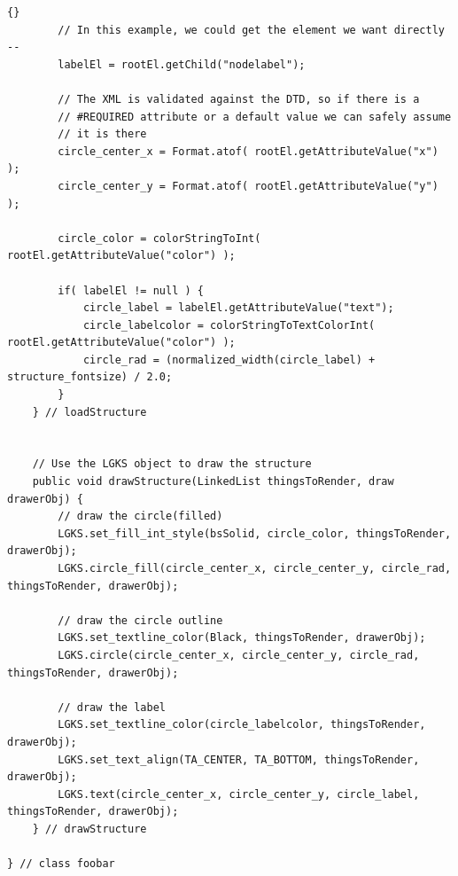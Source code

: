 \documentclass[12pt]{article}
\begin{document}
\begin{lstlisting}{}
        // In this example, we could get the element we want directly --
        labelEl = rootEl.getChild("nodelabel");
        
        // The XML is validated against the DTD, so if there is a
        // #REQUIRED attribute or a default value we can safely assume
        // it is there
        circle_center_x = Format.atof( rootEl.getAttributeValue("x") );
        circle_center_y = Format.atof( rootEl.getAttributeValue("y") );

        circle_color = colorStringToInt( rootEl.getAttributeValue("color") );

        if( labelEl != null ) {
            circle_label = labelEl.getAttributeValue("text");
            circle_labelcolor = colorStringToTextColorInt( rootEl.getAttributeValue("color") );
            circle_rad = (normalized_width(circle_label) + structure_fontsize) / 2.0;
        }
    } // loadStructure


    // Use the LGKS object to draw the structure
    public void drawStructure(LinkedList thingsToRender, draw drawerObj) {
        // draw the circle(filled)
        LGKS.set_fill_int_style(bsSolid, circle_color, thingsToRender, drawerObj);
        LGKS.circle_fill(circle_center_x, circle_center_y, circle_rad, thingsToRender, drawerObj);

        // draw the circle outline
        LGKS.set_textline_color(Black, thingsToRender, drawerObj);
        LGKS.circle(circle_center_x, circle_center_y, circle_rad, thingsToRender, drawerObj);

        // draw the label
        LGKS.set_textline_color(circle_labelcolor, thingsToRender, drawerObj);
        LGKS.set_text_align(TA_CENTER, TA_BOTTOM, thingsToRender, drawerObj);
        LGKS.text(circle_center_x, circle_center_y, circle_label, thingsToRender, drawerObj);
    } // drawStructure

} // class foobar
\end{lstlisting}
\end{document}
